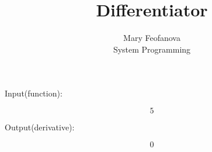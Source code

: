 \documentclass[12pt]{article}
\begin{document}
\title{Differentiator}
\author{Mary Feofanova\\
System Programming}
 
\maketitle
\begin{center}
Input(function):
\end{center}
$$5$$
\begin{center}
Output(derivative):
\end{center}
$$0$$
\end{document}
